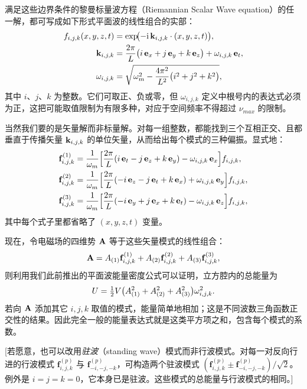 满足这些边界条件的黎曼标量波方程（Riemannian Scalar Wave equation）的任一解，都可写成如下形式平面波的线性组合的实部：
\begin{align}
f_{i,j,k}(x,y,z,t)&=\exp\!\bigl(-\mathrm{i}\,\mathbf{k}_{i,j,k}\cdot(x,y,z,t)\bigr),\\
\mathbf{k}_{i,j,k}&=\frac{2\pi}{L}\bigl(i\,\mathbf{e}_{x}+j\,\mathbf{e}_{y}+k\,\mathbf{e}_{z}\bigr)+\omega_{i,j,k}\,\mathbf{e}_{t},\\
\omega_{i,j,k}&=\sqrt{\omega_m^{2}-\frac{4\pi^{2}}{L^{2}}\bigl(i^{2}+j^{2}+k^{2}\bigr)},
\end{align}
其中 $i$、$j$、$k$ 为整数。它们可取正、负或零，但 $\omega_{i,j,k}$ 定义中根号内的表达式必须为正，这把可能取值限制为有限多种，对应于空间频率不得超过 $\nu_{max}$ 的限制。

当然我们要的是矢量解而非标量解。对每一组整数，都能找到三个互相正交、且都垂直于传播矢量 $\mathbf{k}_{i,j,k}$ 的单位矢量，从而给出每个模式的三种偏振。显式地：
\begin{align}
\mathbf{f}^{(1)}_{i,j,k}&=\frac{1}{\omega_m}\Bigl[\frac{2\pi}{L}(i\,\mathbf{e}_{t}-j\,\mathbf{e}_{z}+k\,\mathbf{e}_{y})-\omega_{i,j,k}\,\mathbf{e}_{x}\Bigr]f_{i,j,k},\\
\mathbf{f}^{(2)}_{i,j,k}&=\frac{1}{\omega_m}\Bigl[\frac{2\pi}{L}(-i\,\mathbf{e}_{z}-j\,\mathbf{e}_{t}+k\,\mathbf{e}_{x})+\omega_{i,j,k}\,\mathbf{e}_{y}\Bigr]f_{i,j,k},\\
\mathbf{f}^{(3)}_{i,j,k}&=\frac{1}{\omega_m}\Bigl[\frac{2\pi}{L}(-i\,\mathbf{e}_{y}+j\,\mathbf{e}_{x}+k\,\mathbf{e}_{t})-\omega_{i,j,k}\,\mathbf{e}_{z}\Bigr]f_{i,j,k},
\end{align}
其中每个式子里都省略了 $(x,y,z,t)$ 变量。

现在，令电磁场的四维势 $\mathbf{A}$ 等于这些矢量模式的线性组合：
\begin{equation}
\mathbf{A}=A_{(1)}\mathbf{f}^{(1)}_{i,j,k}+A_{(2)}\mathbf{f}^{(2)}_{i,j,k}+A_{(3)}\mathbf{f}^{(3)}_{i,j,k},
\end{equation}
则利用我们此前推出的平面波能量密度公式可以证明，立方腔内的总能量为
\begin{equation}
U=\tfrac{1}{2} V\bigl(A_{(1)}^{2}+A_{(2)}^{2}+A_{(3)}^{2}\bigr)\omega_{i,j,k}^{2}.
\end{equation}
若向 $\mathbf{A}$ 添加其它 $i,j,k$ 取值的模式，能量简单地相加；这是不同波数三角函数正交性的结果。因此完全一般的能量表达式就是这类平方项之和，包含每个模式的系数。

[若愿意，也可以改用\emph{驻波}（standing wave）模式而非行波模式。对每一对反向行进的行波模式 $\mathbf{f}^{(p)}_{i,j,k}$ 与 $\mathbf{f}^{(p)}_{-i,-j,-k}$，可构造两个驻波模式 $(\mathbf{f}^{(p)}_{i,j,k}\pm\mathbf{f}^{(p)}_{-i,-j,-k})/\sqrt2$。例外是 $i=j=k=0$，它本身已是驻波。这些模式的总能量与行波模式的相同。]


